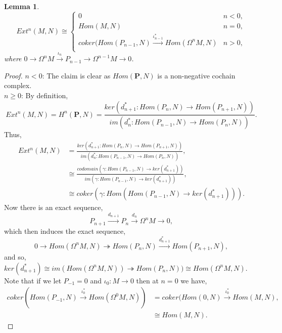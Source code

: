 \documentclass[11.5pt, twoside, a4paper, titlepage]{report}
\theoremstyle{definition}
\theoremstyle{plain}
\newtheorem{lem}[mydef]{Lemma}
\begin{document}
\begin{lem}
\begin{equation*}
Ext^n(M, N) \cong 
\begin{cases}
0& n<0,\\
Hom(M,N) & n=0,\\
coker(Hom(P_{n-1}, N) \xrightarrow{\iota^{\ast}_{n-1}} Hom(\Omega^nM, N) & n>0,\\
\end{cases}
\end{equation*}
where $0\xrightarrow{} \Omega^nM \xrightarrow{\iota_n} P_{n-1} \xrightarrow{}\Omega^{n-1}M\xrightarrow{}0$.
\end{lem}
\begin{proof}
$n<0$: The claim is clear as $Hom(\mathbf{P}, N)$ is a non-negative cochain complex.\\
$n\geq 0$: By definition,
\begin{equation*}
Ext^n(M,N)=H^n(\mathbf{P},N)=\frac{ker(d^{\ast}_{n+1}:Hom(P_{n}, N) \to Hom(P_{n+1}, N))}{im(d^{\ast}_n:Hom(P_{n-1}, N) \to Hom(P_{n}, N))}.
\end{equation*}
Thus, 
\begin{align*}
Ext^n(M,N) &=\frac{ker(d^{\ast}_{n+1}:Hom(P_{n}, N) \to Hom(P_{n+1}, N))}{im(d^{\ast}_n:Hom(P_{n-1}, N) \to Hom(P_{n}, N))}, \\
& \cong \frac{codomain(\gamma: Hom(P_{n-1}, N) \to ker(d^{\ast}_{n+1}))}{im(\gamma:Hom(P_{n-1}, N) \to ker(d^{\ast}_{n+1}))},\\
& \cong coker(\gamma: Hom(Hom(P_{n-1}, N) \to ker(d^{\ast}_{n+1}))).
\end{align*}
Now there is an exact sequence, 
\begin{equation*}
P_{n+1} \xrightarrow{d_{n+1}} P_n \xrightarrow{d_n} \Omega^nM \xrightarrow{}0,
\end{equation*}
which then induces the exact sequence,
\begin{equation*}
0 \xrightarrow{} Hom(\Omega^nM, N) \twoheadrightarrow Hom(P_n, N) \xrightarrow{d^{\ast}_{n+1} } Hom(P_{n+1}, N),
\end{equation*}
and so, $ker(d^{\ast}_{n+1}) \cong im(Hom(\Omega^nM, N))\twoheadrightarrow Hom(P_n, N)) \cong Hom(\Omega^nM, N)$.\\ 
Note that if we let $P_{-1}=0$ and $\iota_0:M \to 0$ then at $n=0$ we have,
\begin{align*}
coker(Hom(P_{-1}, N) \xrightarrow{\iota^{\ast}_0} Hom(\Omega^0M, N))&=coker(Hom(0, N) \xrightarrow{\iota^{\ast}_0} Hom(M, N), \\
&\cong Hom(M,N).
\end{align*}
\end{proof}
\end{document}
